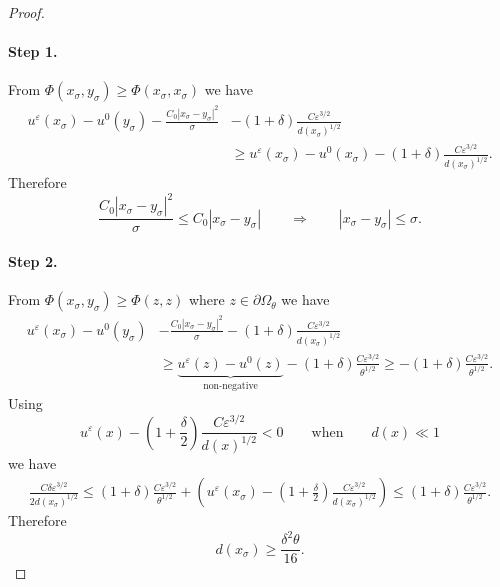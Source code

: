 \documentclass[11pt,reqno]{amsart}
\numberwithin{figure}{section}
\theoremstyle{plain}
\theoremstyle{remark}
\numberwithin{equation}{section}
\newcommand{\sig}{\sigma}
\begin{document}
\begin{proof}
\paragraph{Step 1.} From $\Phi(x_\sigma,y_\sigma) \geq \Phi(x_\sigma,x_\sigma)$ we have
\begin{align*}
     u^\varepsilon(x_\sigma) - u^0(y_\sigma) - \frac{C_0|x_\sigma-y_\sigma|^2}{\sigma} 
     &- \left(1+\delta\right)\frac{C\varepsilon^{3/2}}{d(x_\sigma)^{1/2}} \\
    &\geq  u^\varepsilon(x_\sigma) - u^0(x_\sigma) - \left(1+\delta\right)\frac{C\varepsilon^{3/2}}{d(x_\sigma)^{1/2}}.
\end{align*}
Therefore
\begin{equation*}
    \frac{C_0|x_\sigma - y_\sigma|^2}{\sigma} \leq C_0|x_\sig - y_\sigma| \qquad\Longrightarrow\qquad |x_\sigma - y_\sigma|\leq \sigma.
\end{equation*}
\paragraph{Step 2.} From $\Phi(x_\sigma,y_\sigma) \geq \Phi(z,z)$ where $z\in \partial\Omega_\theta$ we have
\begin{align*}
     u^\varepsilon(x_\sigma) - u^0(y_\sigma) &- \frac{C_0|x_\sigma-y_\sigma|^2}{\sigma} 
     - \left(1+\delta\right)\frac{C\varepsilon^{3/2}}{d(x_\sigma)^{1/2}} \\
    &\geq  \underbrace{u^\varepsilon(z) - u^0(z)}_{\text{non-negative}} - \left(1+\delta\right)\frac{C\varepsilon^{3/2}}{\theta^{1/2}} \geq  - \left(1+\delta\right)\frac{C\varepsilon^{3/2}}{\theta^{1/2}}.
\end{align*}
Using
\begin{equation*}
    u^\varepsilon(x) - \left(1+\frac{\delta}{2}\right)\frac{C\varepsilon^{3/2}}{d(x)^{1/2}} < 0 \qquad\text{when}\qquad d(x)\ll 1
\end{equation*}
we have
\begin{align*}
    \frac{C\delta\varepsilon^{3/2}}{2d(x_\sigma)^{1/2}} \leq  \left(1+\delta\right)\frac{C\varepsilon^{3/2}}{\theta^{1/2}} + \left(u^\varepsilon(x_\sigma) - \left(1+\frac{\delta}{2}\right) \frac{C\varepsilon^{3/2}}{d(x_\sigma)^{1/2}}\right)  \leq \left(1+\delta\right)\frac{C\varepsilon^{3/2}}{\theta^{1/2}}.
\end{align*}
Therefore 
\begin{equation*}
    d(x_\sigma)\geq \frac{\delta^2 \theta}{16}.
\end{equation*}

\end{proof}
\end{document}
